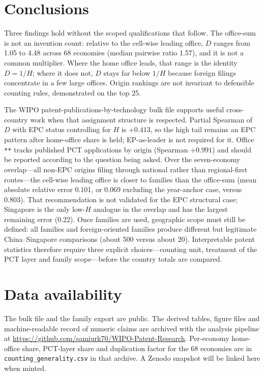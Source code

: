 \documentclass[a4paper,fleqn]{cas-dc}
\begin{document}
\section{Conclusions}\label{sec:conclusions}

Three findings hold without the scoped qualifications that follow. The
office-sum is not an invention count: relative to the cell-wise leading
office, $D$ ranges from 1.05 to 4.48 across 68 economies (median pairwise
ratio 1.57), and it is not a common multiplier. Where the home office leads,
that range is the identity $D=1/H$; where it does not, $D$ stays far below
$1/H$ because foreign filings concentrate in a few large offices. Origin
rankings are not invariant to defensible counting rules, demonstrated on the
top 25.

The WIPO patent-publications-by-technology bulk file supports useful
cross-country work when that assignment structure is respected. Partial
Spearman of $D$ with EPC status controlling for $H$ is $+0.413$, so the high
tail remains an EPC pattern after home-office share is held; EP-as-leader is
not required for it. Office \texttt{**} tracks published PCT applications by
origin (Spearman $+0.991$) and should be reported according to the question
being asked. Over the seven-economy overlap---all non-EPC origins filing
through national rather than regional-first routes---the cell-wise leading
office is closer to families than the office-sum (mean absolute relative
error 0.101, or 0.069 excluding the year-anchor case, versus 0.803). That
recommendation is not validated for the EPC structural case; Singapore is the
only low-$H$ analogue in the overlap and has the largest remaining error
(0.22). Once families are used, geographic scope must still be defined: all
families and foreign-oriented families produce different but legitimate
China--Singapore comparisons (about 500 versus about 20). Interpretable
patent statistics therefore require three explicit choices---counting unit,
treatment of the PCT layer and family scope---before the country totals are
compared.

\section*{Data availability}

The bulk file and the family export are public. The derived tables, figure
files and machine-readable record of numeric claims are archived with the
analysis pipeline at
\url{https://github.com/samiurk70/WIPO-Patent-Research}.
Per-economy home-office share, PCT-layer share and duplication factor for the
68 economies are in \texttt{counting\_generality.csv} in that archive.
A Zenodo snapshot will be linked here when minted.
\end{document}
